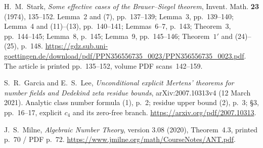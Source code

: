  H.~M.~Stark, \emph{Some effective cases of the
Brauer--Siegel theorem}, Invent. Math. \textbf{23} (1974), 135--152.
Lemma~2 and (7), pp.~137--139; Lemma~3, pp.~139--140; Lemma~4 and
(11)--(13), pp.~140--141; Lemmas~6--7, p.~143; Theorem~3,
pp.~144--145; Lemma~8, p.~145; Lemma~9, pp.~145--146;
Theorem~$1'$ and (24)--(25), p.~148.
\url{https://gdz.sub.uni-goettingen.de/download/pdf/PPN356556735_0023/PPN356556735_0023.pdf}.
The article is printed pp.~135--152, volume PDF scans~142--159.

 S.~R.~Garcia and E.~S.~Lee,
\emph{Unconditional explicit Mertens' theorems for number fields and
Dedekind zeta residue bounds}, arXiv:2007.10313v4 (12 March 2021).
Analytic class number formula (1), p.~2; residue upper bound (2),
p.~3; \S3, pp.~16--17, explicit $c_4$ and its zero-free branch.
\url{https://arxiv.org/pdf/2007.10313}.

 J.~S.~Milne, \emph{Algebraic Number Theory},
version 3.08 (2020), Theorem~4.3, printed p.~70 / PDF p.~72.
\url{https://www.jmilne.org/math/CourseNotes/ANT.pdf}.
